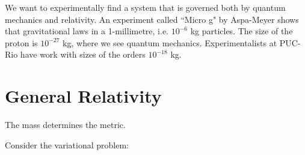 We want to experimentally find a system that is governed both by quantum
mechanics and relativity. An experiment called ``Micro g" by Aspa-Meyer shows
that gravitational laws in a 1-millimetre, i.e. $10^{-6}$ kg particles. The size
of the proton is $10^{-27}$ kg, where we see quantum mechanics. Experimentalists
at PUC-Rio have work with sizes of the orders $10^{-18}$ kg.

\section{General Relativity}
\label{section-general-relativity}
\begin{slogan}
The mass determines the metric.
\end{slogan}
Consider the variational problem:







